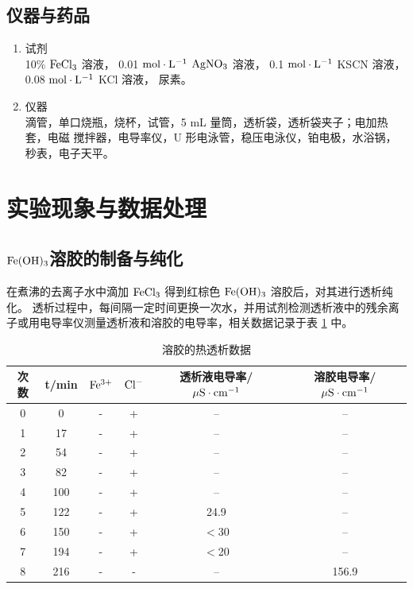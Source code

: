 \documentclass[cn,hazy,pku,12pt,normal,math=newtx,cite=super]{elegantnote}
\begin{document}
\newpage

\subsection{仪器与药品}

\begin{enumerate} %
    \item 试剂 \\   10\% $\rm FeCl_3$ 溶液，
                    0.01 $\rm mol \cdot L^{-1}$ $\rm AgNO_3$ 溶液，
                    0.1 $\rm mol \cdot L^{-1}$ KSCN 溶液，
                    0.08 $\rm mol \cdot L^{-1}$ KCl 溶液，
                    尿素。
    \item 仪器 \\ 滴管，单口烧瓶，烧杯，试管，5 mL 量筒，透析袋，透析袋夹子；电加热套，电磁
    搅拌器，电导率仪，U 形电泳管，稳压电泳仪，铂电极，水浴锅，秒表，电子天平。
\end{enumerate}

\section{实验现象与数据处理}

\subsection[short]{$\rm Fe(OH)_3$溶胶的制备与纯化}

在煮沸的去离子水中滴加 $\rm FeCl_3$ 得到红棕色 $\rm Fe(OH)_3$ 溶胶后，对其进行透析纯化。
透析过程中，每间隔一定时间更换一次水，并用试剂检测透析液中的残余离子或用电导率仪测量透析液和溶胶的电导率，相关数据记录于表 \ref{5} 中。

\begin{table}[h]
    \centering
    \caption{溶胶的热透析数据}
    \label{5}
    \begin{tabular}{cccccc}
    \hline
    次数 & t/min & $\rm Fe^{3+}$ & $\rm Cl^-$ & 透析液电导率/ $\rm \mu S \cdot   cm^{-1}$ & 溶胶电导率/ $\rm \mu S \cdot   cm^{-1}$ \\ \hline
    0 & 0   & - & + & --            & --    \\
    1 & 17  & - & + & --            & --    \\
    2 & 54  & - & + & --            & --    \\
    3 & 82  & - & + & --            & --    \\
    4 & 100 & - & + & --            & --    \\
    5 & 122 & - & + & 24.9          & --    \\
    6 & 150 & - & + & $<$30           & --    \\
    7 & 194 & - & + & $<$20           & --    \\
    8 & 216 & - & - & --            & 156.9 \\ \hline
    \end{tabular}
\end{table}
\end{document}
